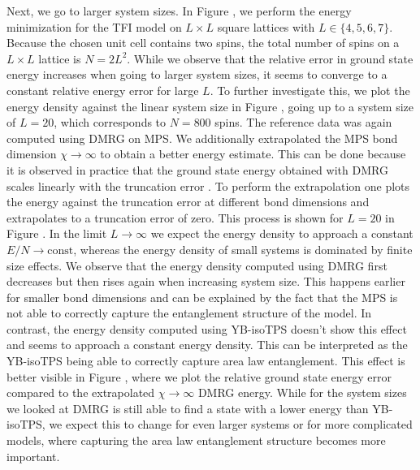 Next, we go to larger system sizes. In Figure , we perform the energy minimization for the TFI model on $L\times L$ square lattices with $L\in\{4,5,6,7\}$. Because the chosen unit cell contains two spins, the total number of spins on a $L\times L$ lattice is $N = 2L^2$. While we observe that the relative error in ground state energy increases when going to larger system sizes, it seems to converge to a constant relative energy error for large $L$. To further investigate this, we plot the energy density against the linear system size in Figure , going up to a system size of $L = 20$, which corresponds to $N = 800$ spins. The reference data was again computed using DMRG on MPS. We additionally extrapolated the MPS bond dimension $\chi\rightarrow\infty$ to obtain a better energy estimate. This can be done because it is observed in practice that the ground state energy obtained with DMRG scales linearly with the truncation error \cite{cite:accuracy_of_DMRG}. To perform the extrapolation one plots the energy against the truncation error at different bond dimensions and extrapolates to a truncation error of zero. This process is shown for $L=20$ in Figure . In the limit $L\rightarrow\infty$ we expect the energy density to approach a constant $E/N\rightarrow \text{const}$, whereas the energy density of small systems is dominated by finite size effects. We observe that the energy density computed using DMRG first decreases but then rises again when increasing system size. This happens earlier for smaller bond dimensions and can be explained by the fact that the MPS is not able to correctly capture the entanglement structure of the model. In contrast, the energy density computed using YB-isoTPS doesn't show this effect and seems to approach a constant energy density. This can be interpreted as the YB-isoTPS being able to correctly capture area law entanglement. This effect is better visible in Figure , where we plot the relative ground state energy error compared to the extrapolated $\chi\rightarrow\infty$ DMRG energy. While for the system sizes we looked at DMRG is still able to find a state with a lower energy than YB-isoTPS, we expect this to change for even larger systems or for more complicated models, where capturing the area law entanglement structure becomes more important. \par
%

